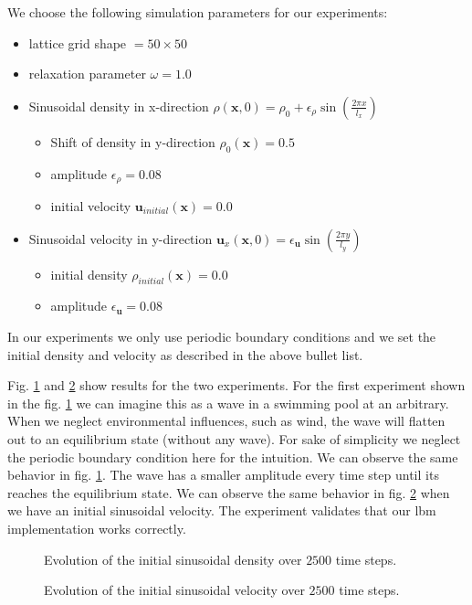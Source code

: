 \documentclass[a4paper,11pt, footsepline]{book}
\begin{document}
We choose the following simulation parameters for our experiments:
\begin{itemize}
\setlength\itemsep{0.15em}
\item lattice grid shape $=50\times 50$
\item relaxation parameter $\omega=1.0$
\item Sinusoidal density in x-direction $\rho(\mathbf{x},0)=\rho_{0}+\epsilon_{\rho}\sin(\frac{2\pi x}{l_x})$
\begin{itemize}
\setlength\itemsep{0.1em}
\item Shift of density in y-direction $\rho_{0}(\mathbf{x})=0.5$
\item amplitude $\epsilon_{\rho}=0.08$
\item initial velocity $\mathbf{u}_{initial}(\mathbf{x})=0.0$
\end{itemize}
\item Sinusoidal velocity in y-direction $\mathbf{u}_{x}(\mathbf{x},0)=\epsilon_{\mathbf{u}}\sin(\frac{2\pi y}{l_y})$
\begin{itemize}
\setlength\itemsep{0.1em}
\item initial density $\rho_{initial}(\mathbf{x})=0.0$
\item amplitude $\epsilon_{\mathbf{u}}=0.08$
\end{itemize}
\end{itemize}

In our experiments we only use periodic boundary conditions and we set the initial density and velocity as described in the above bullet list.

Fig. \ref{fig:evolution_density_surface} and \ref{fig:evolution_velocity_surface} show results for the two experiments. For the first experiment shown in the fig. \ref{fig:evolution_density_surface} we can imagine this as a wave in a swimming pool at an arbitrary. When we neglect environmental influences, such as wind, the wave will flatten out to an equilibrium state (without any wave). For sake of simplicity we neglect the periodic boundary condition here for the intuition. We can observe the same behavior in fig. \ref{fig:evolution_density_surface}. The wave has a smaller amplitude every time step until its reaches the equilibrium state. We can observe the same behavior in fig. \ref{fig:evolution_velocity_surface} when we have an initial sinusoidal velocity. The experiment validates that our \ac{lbm} implementation works correctly.
\begin{figure}
  \begin{center}
	\scalebox{0.7}{}
   \caption{Evolution of the initial sinusoidal density over $2500$ time steps.}
  \label{fig:evolution_density_surface}
  \end{center}
\end{figure}
\begin{figure}
  \begin{center}
	\scalebox{0.7}{}
   \caption{Evolution of the initial sinusoidal velocity over $2500$ time steps.}
  \label{fig:evolution_velocity_surface}
  \end{center}
\end{figure}
\end{document}
